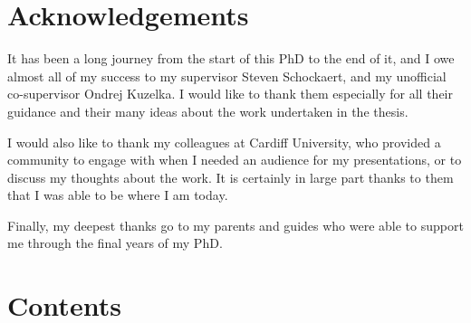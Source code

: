 \documentclass[a4paper,oneside,onecolumn,openright,12pt]{book}
\makeatletter
\def\baselinestretch{1.5}
\def\contentsname{Contents}
\renewcommand\tableofcontents{%
    \if@twocolumn%
      \@restonecoltrue\onecolumn%
    \else%
      \@restonecolfalse%
    \fi%
    \chapter*{\contentsname}%
    \@starttoc{toc}%
    \if@restonecol\twocolumn\fi%
    }
\newcounter{algorithm}[chapter]
\newcommand\listalgorithmsname{List of Algorithms}
\newcommand\listofalgorithms{%
    \if@twocolumn
      \@restonecoltrue\onecolumn
    \elsea
      \@restonecolfalse
    \fi
    \chapter*{\listalgorithmsname}%
      \@mkboth{\listalgorithmsname}{\listalgorithmsname}%
    \@starttoc{loa}%
    \if@restonecol\twocolumn\fi
    }
\renewcommand\listoffigures{%
    \if@twocolumn
      \@restonecoltrue\onecolumn
    \else
      \@restonecolfalse
    \fi
    \chapter*{\listfigurename}%
      \@mkboth{\listfigurename}{\listfigurename}%
    \@starttoc{lof}%
    \if@restonecol\twocolumn\fi
    }
\renewcommand\listoftables{%
    \if@twocolumn
      \@restonecoltrue\onecolumn
    \else
      \@restonecolfalse
    \fi
    \chapter*{\listtablename}%
      \@mkboth{\listtablename}{\listtablename}%
    \@starttoc{lot}%
    \if@restonecol\twocolumn\fi
    }
\makeatother
\begin{document}
  















\def\baselinestretch{1.5}\normalfont


\chapter*{Acknowledgements}

It has been a long journey from the start of this PhD to the end of it, and I owe almost all of my success to my supervisor Steven Schockaert, and my unofficial co-supervisor Ondrej Kuzelka. I would like to thank them especially for all their guidance and their many ideas about the work undertaken in the thesis.

I would also like to thank my colleagues at Cardiff University, who provided a community to engage with when I needed an audience for my presentations, or to discuss my thoughts about the work. It is certainly in large part thanks to them that I was able to be where I am today.

Finally, my deepest thanks go to my parents and guides who were able to support me through the final years of my PhD. 

\tableofcontents



\listoffigures

\listoftables


%

\mainmatter







\backmatter 



\end{document}
